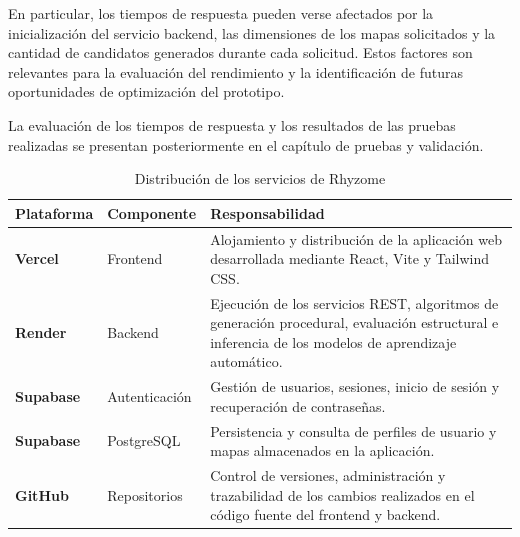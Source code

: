 En particular, los tiempos de respuesta pueden verse afectados por la inicialización del servicio backend, las dimensiones de los mapas solicitados y la cantidad de candidatos generados durante cada solicitud. Estos factores son relevantes para la evaluación del rendimiento y la identificación de futuras oportunidades de optimización del prototipo.

La evaluación de los tiempos de respuesta y los resultados de las pruebas realizadas se presentan posteriormente en el capítulo de pruebas y validación.

\begin{table}[htbp]
	\centering
	
	\caption{Distribución de los servicios de Rhyzome}
	\label{tab:infraestructura_despliegue}
	
	\renewcommand{\arraystretch}{1.5}
	
	\begin{tabularx}{\textwidth}{
			|>{\raggedright\arraybackslash}p{3cm}|
			>{\raggedright\arraybackslash}p{3cm}|
			>{\raggedright\arraybackslash}X|
		}
		\hline
		
		\rowcolor{gray!15}
		\textbf{Plataforma} &
		\textbf{Componente} &
		\textbf{Responsabilidad} \\
		
		\hline
		
		\textbf{Vercel} &
		Frontend &
		Alojamiento y distribución de la aplicación web desarrollada mediante React, Vite y Tailwind CSS. \\
		
		\hline
		
		\textbf{Render} &
		Backend &
		Ejecución de los servicios REST, algoritmos de generación procedural, evaluación estructural e inferencia de los
		modelos de aprendizaje automático. \\
		
		\hline
		
		\textbf{Supabase} &
		Autenticación &
		Gestión de usuarios, sesiones, inicio de sesión y recuperación de contraseñas. \\
		
		\hline
		
		\textbf{Supabase} &
		PostgreSQL &
		Persistencia y consulta de perfiles de usuario y mapas almacenados en la aplicación. \\
		
		\hline
		
		\textbf{GitHub} &
		Repositorios &
		Control de versiones, administración y trazabilidad de los cambios realizados en el código fuente del frontend y backend. \\
		

\end{tabularx}
\end{table}
